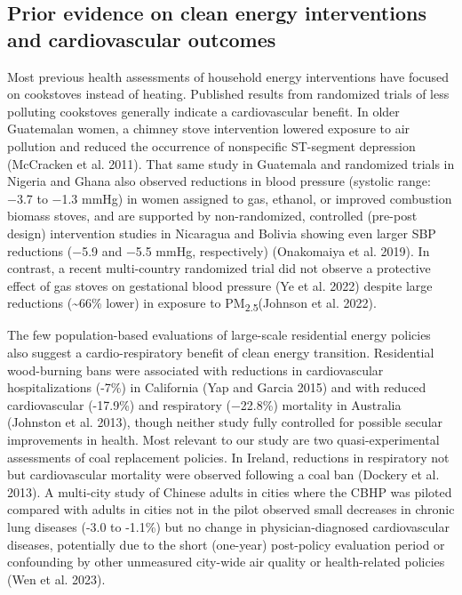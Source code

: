 \documentclass[
  letterpaper,
  DIV=11,
  numbers=noendperiod]{scrartcl}
\begin{document}
\hypertarget{prior-evidence-on-clean-energy-interventions-and-cardiovascular-outcomes}{%
\subsection{Prior evidence on clean energy interventions and
cardiovascular
outcomes}\label{prior-evidence-on-clean-energy-interventions-and-cardiovascular-outcomes}}

Most previous health assessments of household energy interventions have
focused on cookstoves instead of heating. Published results from
randomized trials of less polluting cookstoves generally indicate a
cardiovascular benefit. In older Guatemalan women, a chimney stove
intervention lowered exposure to air pollution and reduced the
occurrence of nonspecific ST-segment depression (McCracken et al. 2011).
That same study in Guatemala and randomized trials in Nigeria and Ghana
also observed reductions in blood pressure (systolic range: −3.7 to −1.3
mmHg) in women assigned to gas, ethanol, or improved combustion biomass
stoves, and are supported by non-randomized, controlled (pre-post
design) intervention studies in Nicaragua and Bolivia showing even
larger SBP reductions (−5.9 and −5.5 mmHg, respectively) (Onakomaiya et
al. 2019). In contrast, a recent multi-country randomized trial did not
observe a protective effect of gas stoves on gestational blood pressure
(Ye et al. 2022) despite large reductions (\textasciitilde66\% lower) in
exposure to PM\textsubscript{2.5}(Johnson et al. 2022).

The few population-based evaluations of large-scale residential energy
policies also suggest a cardio-respiratory benefit of clean energy
transition. Residential wood-burning bans were associated with
reductions in cardiovascular hospitalizations (-7\%) in California (Yap
and Garcia 2015) and with reduced cardiovascular (-17.9\%) and
respiratory (−22.8\%) mortality in Australia (Johnston et al. 2013),
though neither study fully controlled for possible secular improvements
in health. Most relevant to our study are two quasi-experimental
assessments of coal replacement policies. In Ireland, reductions in
respiratory not but cardiovascular mortality were observed following a
coal ban (Dockery et al. 2013). A multi-city study of Chinese adults in
cities where the CBHP was piloted compared with adults in cities not in
the pilot observed small decreases in chronic lung diseases (-3.0 to
-1.1\%) but no change in physician-diagnosed cardiovascular diseases,
potentially due to the short (one-year) post-policy evaluation period or
confounding by other unmeasured city-wide air quality or health-related
policies (Wen et al. 2023).
\end{document}
